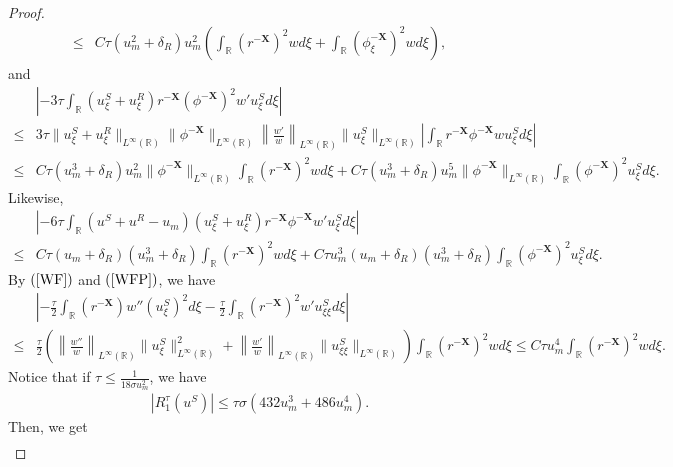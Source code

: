 \documentclass[10pt,reqno]{amsart}
\numberwithin{equation}{section}
\begin{document}
\begin{proof}
\begin{align*}
			\leq&C\tau \left(u_m^2+\delta_R\right)u_m^2\left(\int_{\mathbb{R}}(r^{-\mathbf{X}})^2wd\xi+\int_{\mathbb{R}}(\phi_{\xi}^{-\mathbf{X}})^2wd\xi\right),
		\end{align*}
		and
		\begin{align*}
			&\left|-3\tau\int_{\mathbb{R}}(u_{\xi}^{S}+u_{\xi}^{R})r^{-\mathbf{X}}(\phi^{-\mathbf{X}})^{2}w'u_{\xi}^{S}d\xi\right|\\
			\leq&3\tau\|u_{\xi}^S+u^R_{\xi}\|_{L^{\infty}(\mathbb{R})}\lVert\phi^{-\mathbf{X}}\rVert_{L^{\infty}(\mathbb{R})}\left\lVert\frac{w'}{w}\right\rVert_{L^{\infty}(\mathbb{R})}\|u_{\xi}^S\|_{L^{\infty}(\mathbb{R})}\left|\int_{\mathbb{R}}r^{-\mathbf{X}}\phi^{-\mathbf{X}}wu_{\xi}^Sd\xi\right|\\
			\leq&C\tau(u_m^3+\delta_R)u_m^2\lVert\phi^{-\mathbf{X}}\rVert_{L^{\infty}(\mathbb{R})}\int_{\mathbb{R}}(r^{-\mathbf{X}})^2wd\xi+C\tau(u_m^3+\delta_R)u_m^5\lVert\phi^{-\mathbf{X}}\rVert_{L^{\infty}(\mathbb{R})}\int_{\mathbb{R}}(\phi^{-\mathbf{X}})^2u^S_{\xi}d\xi.
		\end{align*}
		Likewise,
		\begin{align*}
			&\left|-6\tau\int_{\mathbb{R}}(u^{S}+u^{R}-u_{m})(u_{\xi}^{S}+u_{\xi}^{R})r^{-\mathbf{X}}\phi^{-\mathbf{X}}w'u_{\xi}^{S}d\xi\right|\\
			\leq& C\tau(u_m+\delta_R)(u_m^3+\delta_R)\int_{\mathbb{R}}(r^{-\mathbf{X}})^2wd\xi+C\tau u_m^3(u_m+\delta_R)(u_m^3+\delta_R)\int_{\mathbb{R}}(\phi^{-\mathbf{X}})^2u^S_{\xi}d\xi.
		\end{align*}
		By $(\ref{WF})$ and $(\ref{WFP})$, we have
		\begin{align*}
			&\left|-\frac{\tau}{2}\int_{\mathbb{R}}(r^{-\mathbf{X}})w''(u_{\xi}^{S})^{2}d\xi-\frac{\tau}{2}\int_{\mathbb{R}}(r^{-\mathbf{X}})^{2}w'u_{\xi\xi}^Sd\xi\right|\\
			\leq&\frac{\tau}{2}\left(\left\lVert\frac{w''}{w}\right\rVert_{L^{\infty}(\mathbb{R})}\|u_{\xi}^S\|_{L^{\infty}(\mathbb{R})}^2+\left\lVert\frac{w'}{w}\right\rVert_{L^{\infty}(\mathbb{R})}\|u_{\xi\xi}^S\|_{L^{\infty}(\mathbb{R})}\right)\int_{\mathbb{R}}(r^{-\mathbf{X}})^2wd\xi
			\leq C\tau u_m^4\int_{\mathbb{R}}(r^{-\mathbf{X}})^2wd\xi.
		\end{align*}
		Notice that if $\tau\leq \frac{1}{18\sigma u_m^2}$, we have
		\begin{align*}
			\left|R_{1}^{\tau}(u^S)\right|\leq \tau\sigma\left(432u_m^3+486u_m^4\right).
		\end{align*}
		Then, we get
		\begin{align*}

\end{align*}
\end{proof}
\end{document}
